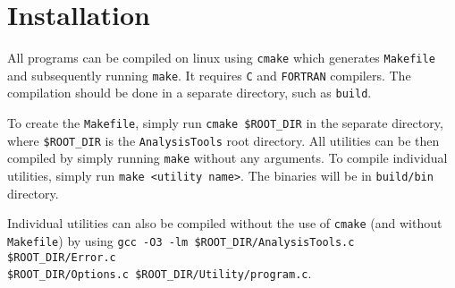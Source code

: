 \chapter{Installation} \label{chap:Install}

All programs can be compiled on linux using \texttt{cmake} which generates
\texttt{Makefile} and subsequently running \texttt{make}. It requires
\texttt{C} and \texttt{FORTRAN} compilers.  The compilation should be done
in a separate directory, such as \texttt{build}.

To create the \texttt{Makefile}, simply run \texttt{cmake \$ROOT\_DIR} in
the separate directory, where \texttt{\$ROOT\_DIR} is the
\texttt{AnalysisTools} root directory.  All utilities can be then compiled
by simply running \texttt{make} without any arguments. To compile
individual utilities, simply run \texttt{make <utility name>}. The binaries
will be in \texttt{build/bin} directory.

Individual utilities can also be compiled without the use of \texttt{cmake}
(and without \texttt{Makefile}) by using
\texttt{gcc -O3 -lm \$ROOT\_DIR/AnalysisTools.c \$ROOT\_DIR/Error.c}\\
\texttt{\$ROOT\_DIR/Options.c \$ROOT\_DIR/Utility/program.c}.
\vspace{1em}

